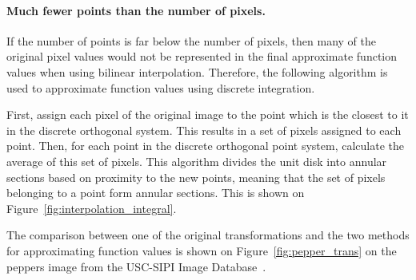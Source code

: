 \paragraph{Much fewer points than the number of pixels.}
If the number of points is far below the number of pixels, then many of the original pixel values would not be represented in the final approximate function values when using bilinear interpolation. Therefore, the following algorithm is used to approximate function values using discrete integration.

First, assign each pixel of the original image to the point which is the closest to it in the discrete orthogonal system. This results in a set of pixels assigned to each point. Then, for each point in the discrete orthogonal point system, calculate the average of this set of pixels. This algorithm divides the unit disk into annular sections based on proximity to the new points, meaning that the set of pixels belonging to a point form annular sections. This is shown on Figure~\ref{fig:interpolation_integral}.

The comparison between one of the original transformations and the two methods for approximating function values is shown on Figure~\ref{fig:pepper_trans} on the peppers image from the USC-SIPI Image Database~\cite{usc_sipi}.

